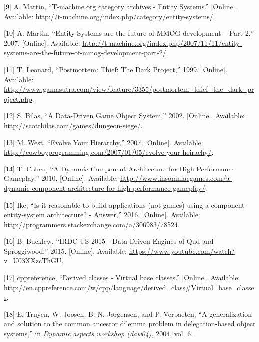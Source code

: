 \documentclass[twoside, 12pt, a4paper, openright]{book}
\begin{document}
\hypertarget{ref-tmachine_es_category}{}
{[}9{]} A. Martin, ``T-machine.org category archives - Entity Systems.''
{[}Online{]}. Available:
\url{http://t-machine.org/index.php/category/entity-systems/}.

\hypertarget{ref-tmachine_esmmogfuturep2_2007}{}
{[}10{]} A. Martin, ``Entity Systems are the future of MMOG development
-- Part 2,'' 2007. {[}Online{]}. Available:
\url{http://t-machine.org/index.php/2007/11/11/entity-systems-are-the-future-of-mmog-development-part-2/}.

\hypertarget{ref-tomleonard_thiefpostmortem_1999}{}
{[}11{]} T. Leonard, ``Postmortem: Thief: The Dark Project,'' 1999.
{[}Online{]}. Available:
\url{http://www.gamasutra.com/view/feature/3355/postmortem_thief_the_dark_project.php}.

\hypertarget{ref-scottbilas_dungeonsiege_2002}{}
{[}12{]} S. Bilas, ``A Data-Driven Game Object System,'' 2002.
{[}Online{]}. Available:
\url{http://scottbilas.com/games/dungeon-siege/}.

\hypertarget{ref-mickwest_evolveyourhierarchy_2007}{}
{[}13{]} M. West, ``Evolve Your Hierarchy,'' 2007. {[}Online{]}.
Available:
\url{http://cowboyprogramming.com/2007/01/05/evolve-your-heirachy/}.

\hypertarget{ref-terrancecohen_dynamiccomparchitecture_2010}{}
{[}14{]} T. Cohen, ``A Dynamic Component Architecture for High
Performance Gameplay,'' 2010. {[}Online{]}. Available:
\url{http://www.insomniacgames.com/a-dynamic-component-architecture-for-high-performance-gameplay/}.

\hypertarget{ref-stackexchange_ixe_answer}{}
{[}15{]} Ike, ``Is it reasonable to build applications (not games) using
a component-entity-system architecture? - Answer,'' 2016. {[}Online{]}.
Available: \url{http://programmers.stackexchange.com/a/306983/78524}.

\hypertarget{ref-sproggiwood_irdc_2015_talk}{}
{[}16{]} B. Bucklew, ``IRDC US 2015 - Data-Driven Engines of Qud and
Sproggiwood,'' 2015. {[}Online{]}. Available:
\url{https://www.youtube.com/watch?v=U03XXzcThGU}.

\hypertarget{ref-cppreference_virtual_base_classes}{}
{[}17{]} cppreference, ``Derived classes - Virtual base classes.''
{[}Online{]}. Available:
\url{http://en.cppreference.com/w/cpp/language/derived_class\#Virtual_base_classes}.

\hypertarget{ref-truyen2004generalization}{}
{[}18{]} E. Truyen, W. Joosen, B. N. Jørgensen, and P. Verbaeten, ``A
generalization and solution to the common ancestor dilemma problem in
delegation-based object systems,'' in \emph{Dynamic aspects workshop
(daw04)}, 2004, vol. 6.
\end{document}
